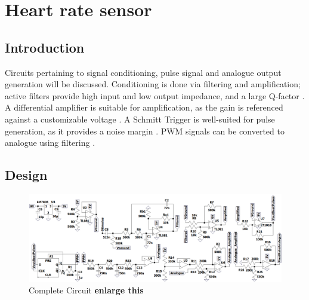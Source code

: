 \chapter{Heart rate sensor}\label{ch:heartRate}

\section{Introduction} \label{sec:heartIntro}
Circuits pertaining to signal conditioning, pulse signal and analogue output generation will be discussed. Conditioning is done via filtering and amplification; active filters provide high input and low output impedance, and a large Q-factor \cite{actpas}. A differential amplifier is suitable for amplification, as the gain is referenced against a customizable voltage \cite{opamp}. A Schmitt Trigger is well-suited for pulse generation, as it provides a noise margin \cite{schmitt}. PWM signals can be converted to analogue using filtering \cite{PWM}.

\section{Design} \label{sec:heartDesign}
\begin{figure}[h]
    \centering
    \vspace{-0.7cm}
    \includegraphics[width = 1\textwidth]{Figures/circuit}
    \caption{Complete Circuit \textbf{enlarge this}}
    \label{fig:circuit}
\end{figure}

